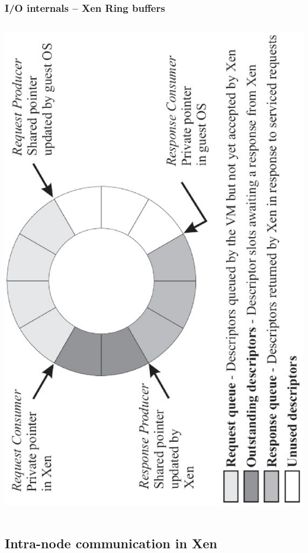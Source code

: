 \documentclass[red,slidestop,notes,compress,mathserif]{beamer}
\begin{document}
\begin{frame}
\frametitle{I/O internals -- Xen Ring buffers}
\begin{columns}
\column{\textwidth}
\includegraphics[width=.6\textwidth,angle=-90]{figures/test.eps}
\end{columns}
\end{frame}



\subsection{Intra-node communication in Xen}
\end{document}
